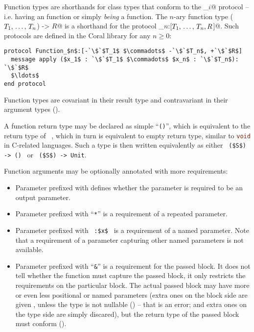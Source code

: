 Function types are shorthands for class types that conform to the \lstinline@Function_$i$@ protocol -- i.e. having an  function or simply {\em being} a function. The $n$-ary function type \lstinline@($T_1 ,\, \ldots ,\, T_n$) -> $R$@ is a shorthand for the protocol \lstinline@Function_$n$:[$T_1 ,\, \ldots ,\, T_n,R$]@. Such protocols are defined in the Coral library for any $n \ge 0$:

\begin{lstlisting}[escapechar=`]
protocol Function_$n$:[-`\$`$T_1$ $\commadots$ -`\$`$T_n$, +`\$`$R$]
  message apply ($x_1$ : `\$`$T_1$ $\commadots$ $x_n$ : `\$`$T_n$): `\$`$R$
  $\ldots$
end protocol
\end{lstlisting}

Function types are covariant in their result type and contravariant in their argument types ().

A function return type may be declared as simple ``\lstinline!()!'', which is equivalent to the return type of ~, which in turn is equivalent to empty return type, similar to \lstinline[language=C]!void! in C-related languages. Such a type is then written equivalently as either ~\lstinline!($S$) -> ()!~ or ~\lstinline!($S$) -> Unit!. 

Function arguments may be optionally annotated with more requirements: 
\begin{itemize}
\item
Parameter prefixed with  defines whether the parameter is required to be an output parameter. 

\item
Parameter prefixed with ``\lstinline!*!'' is a requirement of a repeated parameter. 

\item 
Parameter prefixed with ~\lstinline!:$x$!~ is a requirement of a named parameter. Note that a requirement of a parameter capturing other named parameters is not available. 

\item
Parameter prefixed with ``\lstinline!&!'' is a requirement for the passed block. It does not tell whether the function must capture the passed block, it only restricts the requirements on the particular block. The actual passed block may have more or even less positional or named parameters (extra ones on the block side are given , unless the type is not nullable () -- that is an error; and extra ones on the type side are simply discared), but the return type of the passed block must conform (). 
\end{itemize}






